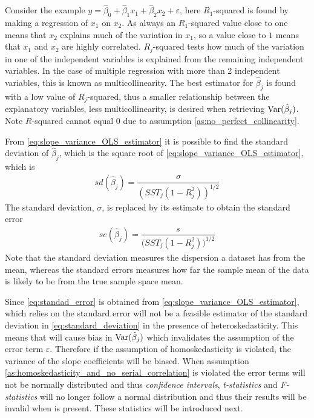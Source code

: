 Consider the example $y = \hat{\beta}_0 + \hat{\beta}_1 x_1 + \hat{\beta}_2 x_2 + \varepsilon$, here $R_1$-squared is found by making a regression of $x_1$ on $x_2$. 
As always an $R_1$-squared value close to one means that $x_2$ explains much of the variation in $x_1$, so a value close to $1$ means that $x_1$ and $x_2$ are highly correlated.
$R_j$-squared tests how much of the variation in one of the independent variables is explained from the remaining independent variables.
In the case of multiple regression with more than 2 independent variables, this is known as multicollinearity.
The best estimator for $\hat{\beta}_j$ is found with a low value of $R_j$-squared, thus a smaller relationship between the explanatory variables, less multicollinearity, is desired when retrieving $\operatorname{\text{Var}}(\hat{\beta}_j)$.
Note $R$-squared cannot equal $0$ due to assumption \ref{as:no_perfect_collinearity}. 

From \eqref{eq:slope_variance_OLS_estimator} it is possible to find the standard deviation of $\hat{\beta}_j$, which is the square root of \ref{eq:slope_variance_OLS_estimator}, which is
\begin{align}\label{eq:standard_deviation}
    sd(\hat{\beta}_j) = \dfrac{\sigma}{\left(SST_j(1- R_j^2)\right)^{1/2}}
\end{align}
The standard deviation, $\sigma$, is replaced by its estimate to obtain the standard error
\begin{align}\label{eq:standad_error}
    se(\hat{\beta}_j) = \dfrac{s}{\big(SST_j(1- R_j^2)\big)^{1/2}}
\end{align}
Note that the standard deviation measures the dispersion a dataset has from the mean, whereas the standard errors measures how far the sample mean of the data is likely to be from the true sample space mean. 

Since \eqref{eq:standad_error} is obtained from \eqref{eq:slope_variance_OLS_estimator}, which relies on \homo the standard error will not be a feasible estimator of the standard deviation in \eqref{eq:standard_deviation} in the presence of heteroskedasticity. This means that \hetero will cause bias in $\operatorname{\text{Var}}(\hat{\beta}_j)$ which invalidates the assumption of the error term $\varepsilon$.
Therefore if the assumption of homoskedasticity is violated, the variance of the slope coefficients will be biased. When assumption \ref{as:homoskedasticity_and_no_serial_correlation} is violated the error terms will not be normally distributed and thus \textit{confidence intervals}, \textit{t-statistics} and \textit{F-statistics} will no longer follow a normal distribution and thus their results will be invalid when \hetero is present. These statistics will be introduced next.

